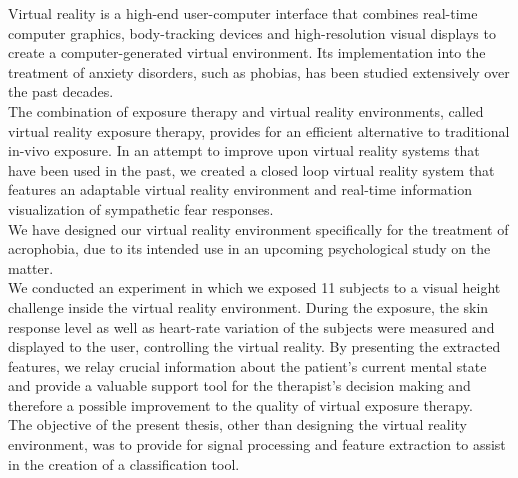 
Virtual reality is a high-end user-computer interface that combines real-time computer graphics, body-tracking devices and high-resolution visual displays to create a computer-generated virtual environment. Its implementation into the treatment of anxiety disorders, such as phobias, has been studied extensively over the past decades. \\
The combination of exposure therapy and virtual reality environments, called virtual reality exposure therapy, provides for an efficient alternative to traditional in-vivo exposure. In an attempt to improve upon virtual reality systems that have been used in the past, we created a closed loop virtual reality system that features an adaptable virtual reality environment and real-time information visualization of sympathetic fear responses.\\
We have designed our virtual reality environment specifically for the treatment of acrophobia, due to its intended use in an upcoming psychological study on the matter.\\
We conducted an experiment in which we exposed 11 subjects to a visual height challenge inside the virtual reality environment. During the exposure, the skin response level as well as heart-rate variation of the subjects were measured and displayed to the user, controlling the virtual reality. By presenting the extracted features, we relay crucial information about the patient's current mental state and provide a valuable support tool for the therapist's decision making and therefore a possible improvement to the quality of virtual exposure therapy. \\
The objective of the present thesis, other than designing the virtual reality environment, was to provide for signal processing and feature extraction to assist in the creation of a classification tool.   




